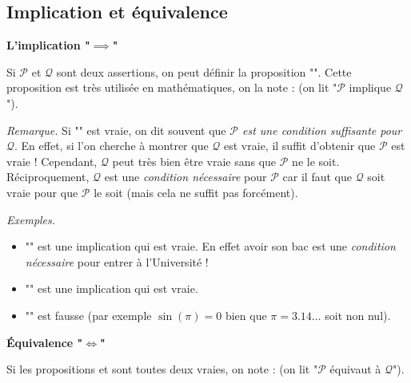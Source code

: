 \documentclass[11pt,class=report,crop=false]{standalone}
\begin{document}
\subsection*{Implication et équivalence}

\textbf{L'implication "$\implies$"}

Si $\mathcal{P}$ et $\mathcal{Q}$ sont deux assertions, on peut définir la proposition "". Cette proposition est très utilisée en mathématiques, on la note :  (on lit "$\mathcal{P}$ implique $\mathcal{Q}$").

\medskip

\emph{Remarque.}
Si "" est vraie, on dit souvent que \emph{$\mathcal{P}$ est une condition suffisante pour $\mathcal{Q}$}. En effet, si l'on cherche à montrer que $\mathcal{Q}$ est vraie, il suffit d'obtenir que $\mathcal{P}$ est vraie ! Cependant, $\mathcal{Q}$ peut très bien être vraie sans que $\mathcal{P}$ ne le soit. Réciproquement, $\mathcal{Q}$ est une \emph{condition nécessaire} pour $\mathcal{P}$ car il faut que $\mathcal{Q}$ soit vraie pour que $\mathcal{P}$ le soit (mais cela ne suffit pas forcément).

\medskip

\emph{Exemples.}
    
\begin{itemize}
        \item"" est une implication qui est vraie. En effet avoir son bac est une \textit{condition nécessaire} pour entrer à l'Université !
        \item "" est une implication qui est vraie.
        \item "" est fausse (par exemple $\sin(\pi)=0$ bien que $\pi = 3.14\ldots$ soit non nul).      
\end{itemize}



\bigskip


\textbf{Équivalence "$\iff$"}

Si les propositions  et  sont toutes deux vraies, on note :  (on lit "$\mathcal{P}$ équivaut à $\mathcal{Q}$").
\end{document}
